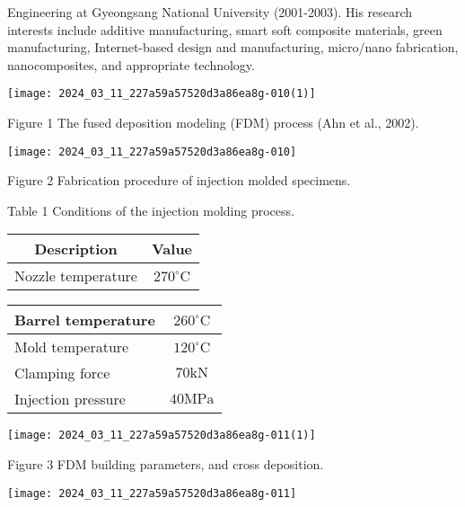 \documentclass[10pt]{article}
\begin{document}
Engineering at Gyeongsang National University (2001-2003). His research interests include additive manufacturing, smart soft composite materials, green manufacturing, Internet-based design and manufacturing, micro/nano fabrication, nanocomposites, and appropriate technology.

\begin{center}
\texttt{[image: 2024\_03\_11\_227a59a57520d3a86ea8g-010(1)]}
\end{center}

Figure 1 The fused deposition modeling (FDM) process (Ahn et al., 2002).

\begin{center}
\texttt{[image: 2024\_03\_11\_227a59a57520d3a86ea8g-010]}
\end{center}

Figure 2 Fabrication procedure of injection molded specimens.

Table 1 Conditions of the injection molding process.

\begin{center}
\begin{tabular}{cc}
\hline
Description & Value \\
\hline
Nozzle temperature & $270^{\circ} \mathrm{C}$ \\
\hline
\end{tabular}
\end{center}

\begin{center}
\begin{tabular}{lc}
\hline
Barrel temperature & $260^{\circ} \mathrm{C}$ \\
\hline
Mold temperature & $120^{\circ} \mathrm{C}$ \\
\hline
Clamping force & $70 \mathrm{kN}$ \\
\hline
Injection pressure & $40 \mathrm{MPa}$ \\
\hline
\end{tabular}
\end{center}

\begin{center}
\texttt{[image: 2024\_03\_11\_227a59a57520d3a86ea8g-011(1)]}
\end{center}

Figure 3 FDM building parameters, and cross deposition.

\begin{center}
\texttt{[image: 2024\_03\_11\_227a59a57520d3a86ea8g-011]}
\end{center}
\end{document}
